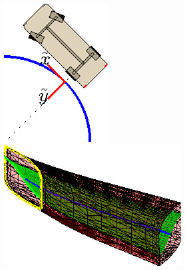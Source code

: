 \begin{figure}[bt]
\begin{center}
\vspace{0.25ex}
\begin{minipage}[b]{0.98\linewidth}
\centering
\begin{minipage}[b]{\linewidth}
\begin{minipage}[c]{0.45\linewidth} %
  \centering
  \includegraphics[width=0.4\linewidth]{graphics/policy_curve.eps} 
\end{minipage}
\hspace{0.05\linewidth} %
\begin{minipage}[c]{0.45\linewidth}
  \centering 
  \includegraphics[width=0.7\linewidth]{graphics/policy_tube.eps}
\end{minipage}
\end{minipage}

\vspace{0.5ex}

\begin{minipage}[b]{\linewidth}
\begin{minipage}[t]{0.48\linewidth} %
\centering


\end{minipage}
\end{minipage}
\end{minipage}
\end{center}
\end{figure}
